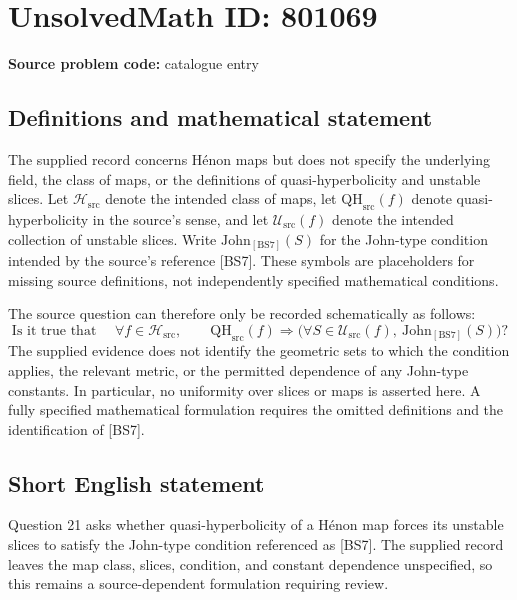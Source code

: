 \documentclass[11pt]{article}
\begin{document}
\section*{UnsolvedMath ID: 801069}
\textbf{Source problem code:} catalogue entry
\subsection{Definitions and mathematical statement}
The supplied record concerns H\'enon maps but does not specify the underlying field, the class of maps, or the definitions of quasi-hyperbolicity and unstable slices. Let \(\mathcal H_{\mathrm{src}}\) denote the intended class of maps, let \(\mathrm{QH}_{\mathrm{src}}(f)\) denote quasi-hyperbolicity in the source's sense, and let \(\mathcal U_{\mathrm{src}}(f)\) denote the intended collection of unstable slices. Write \(\mathrm{John}_{[\mathrm{BS7}]}(S)\) for the John-type condition intended by the source's reference [BS7]. These symbols are placeholders for missing source definitions, not independently specified mathematical conditions.

The source question can therefore only be recorded schematically as follows:
\[
\text{Is it true that }\quad
\forall f\in\mathcal H_{\mathrm{src}},\qquad
\mathrm{QH}_{\mathrm{src}}(f)
\Longrightarrow
\bigl(\forall S\in\mathcal U_{\mathrm{src}}(f),\ \mathrm{John}_{[\mathrm{BS7}]}(S)\bigr)?
\]
The supplied evidence does not identify the geometric sets to which the condition applies, the relevant metric, or the permitted dependence of any John-type constants. In particular, no uniformity over slices or maps is asserted here. A fully specified mathematical formulation requires the omitted definitions and the identification of [BS7].
\subsection{Short English statement}
Question 21 asks whether quasi-hyperbolicity of a H\'enon map forces its unstable slices to satisfy the John-type condition referenced as [BS7]. The supplied record leaves the map class, slices, condition, and constant dependence unspecified, so this remains a source-dependent formulation requiring review.
\end{document}
